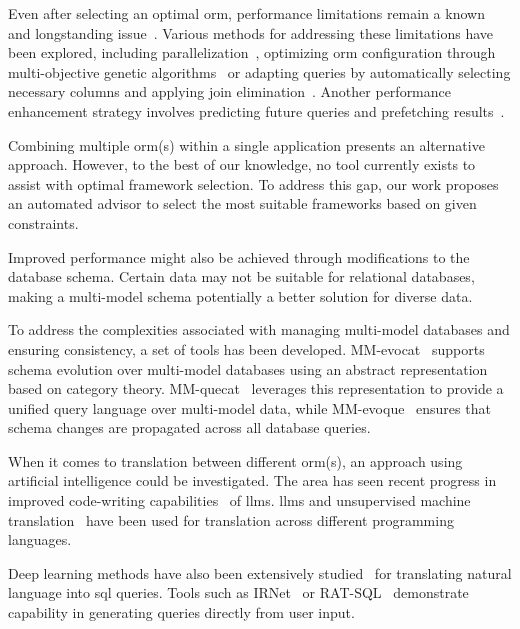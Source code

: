 Even after selecting an optimal \acrshort{orm}, performance limitations remain a known and longstanding issue~\cite{survey_hule_ranawat_2023}. Various methods for addressing these limitations have been explored, including parallelization~\cite{orm_parallel}, optimizing \acrshort{orm} configuration through multi-objective genetic algorithms~\cite{orm_configuration_optimization} or adapting queries by automatically selecting necessary columns and applying join elimination~\cite{quartarone2020adaptive}. Another performance enhancement strategy involves predicting future queries and prefetching results~\cite{prefetching}.

Combining multiple \acrshort{orm}(s) within a single application presents an alternative approach. However, to the best of our knowledge, no tool currently exists to assist with optimal framework selection. To address this gap, our work proposes an automated advisor to select the most suitable frameworks based on given constraints. 

Improved performance might also be achieved through modifications to the database schema. Certain data may not be suitable for relational databases, making a multi-model schema potentially a better solution for diverse data. 

To address the complexities associated with managing multi-model databases and ensuring consistency, a set of tools has been developed. MM-evocat~\cite{mm_evocat} supports schema evolution over multi-model databases using an abstract representation based on category theory. MM-quecat~\cite{mm_quecat} leverages this representation to provide a unified query language over multi-model data, while MM-evoque~\cite{mm_evoque} ensures that schema changes are propagated across all database queries. 

When it comes to translation between different \acrshort{orm}(s), an approach using artificial intelligence could be investigated. The area has seen recent progress in improved code-writing capabilities~\cite{evaluatingllms} of \acrlong{llm}s. \acrshort{llm}s\cite{transagentllm} and unsupervised machine translation~\cite{translation_unsupervised} have been used for translation across different programming languages.%

Deep learning methods have also been extensively studied~\cite{DBLP:journals/vldb/KatsogiannisMeimarakisK23} for translating natural language into \acrshort{sql} queries. Tools such as IRNet~\cite{text-to-sql-irnet} or RAT-SQL~\cite{text-to-sql-rat} demonstrate capability in generating queries directly from user input.


